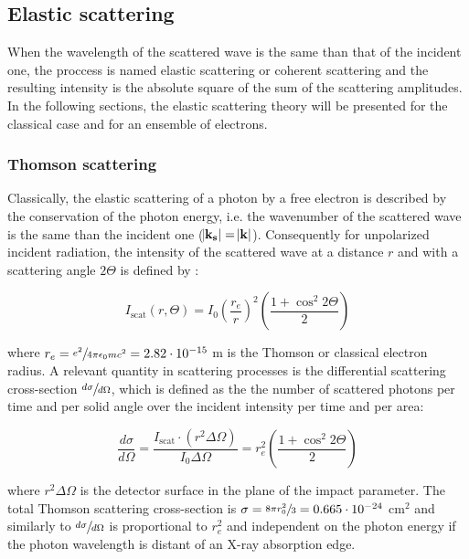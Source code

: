 \subsection{Elastic scattering}
\label{sec:ElasticScattering}

When the wavelength of the scattered wave is the same than that of the incident one, the proccess is named elastic scattering or coherent scattering and the resulting intensity is the absolute square of the sum of the scattering amplitudes. In the following sections, the elastic scattering theory will be presented for the classical case and for an ensemble of electrons.

\subsubsection{Thomson scattering}

Classically, the elastic scattering of a photon by a free electron is described by the conservation of the photon energy, i.e. the wavenumber of the scattered wave is the same than the incident one ($\abs{\boldsymbol{\mathbf{k_s}}}=\abs{\boldsymbol{\mathbf{k}}}$). Consequently for unpolarized incident radiation, the intensity of the scattered wave at a distance $r$ and with a scattering angle $2\Theta$ is defined by \citep{warren_x-ray_1969}:

\begin{equation}
        I_{\text{scat}}\left( r,\Theta \right)= I_0 \left( \frac{r_e}{r} \right) ^2 \left( \frac{1+\cos^2{2\Theta}}{2} \right)
\end{equation}

where $r_e= \sfrac{e^2}{4\pi\epsilon_0 m c^2}=2.82\cdot10^{-15}$ m is the Thomson or classical electron radius. A relevant quantity in scattering processes is the differential scattering cross-section $\sfrac{d\sigma}{d\Omega}$, which is defined as the the number of scattered photons per time and per solid angle over the incident intensity per time and per area\citep{als-nielsen_elements_2011}:

\begin{equation}
        \label{eq:thomson_cross_section}
        \frac{d\sigma}{d\Omega}= \frac{I_{\text{scat}} \cdot \left(r^2 \Delta \Omega \right)}{I_0\Delta \Omega}=r_e^2\left( \frac{1+\cos^2{2\Theta}}{2} \right)
\end{equation}

where $r^2 \Delta \Omega$ is the detector surface in the plane of the impact parameter. The total Thomson scattering cross-section is $\sigma = \sfrac{8\pi r_0^2}{3} = 0.665\cdot10^{-24}$ cm$^2$ and similarly to $\sfrac{d\sigma}{d\Omega}$ is proportional to $r_e^2$ and independent on the photon energy if the photon wavelength is distant of an X-ray absorption edge.

